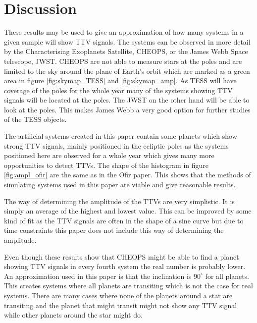 \documentclass[12pt]{report}
\begin{document}

\chapter{Discussion}
	These results may be used to give an approximation of how many systems in a given sample will show TTV signals. The systems can be observed in more detail by the Characterising Exoplanets Satellite, CHEOPS, or the James Webb Space telescope, JWST. CHEOPS are not able to measure stars at the poles and are limited to the sky around the plane of Earth's orbit which are marked as a green area in figure \ref{fig:skymap_TESS} and \ref{fig:skymap_amp}. As TESS will have coverage of the poles for the whole year many of the systems showing TTV signals will be located at the poles. The JWST on the other hand will be able to look at the poles. This makes James Webb a very good option for further studies of the TESS objects. 
	
	The artificial systems created in this paper contain some planets which show strong TTV signals, mainly positioned in the ecliptic poles as the systems positioned here are observed for a whole year which gives many more opportunities to detect TTVs. The shape of the histogram in figure \ref{fig:ampl_ofir} are the same as in the Ofir paper. This shows that the methods of simulating systems used in this paper are viable and give reasonable results.
	
	The way of determining the amplitude of the TTVs are very simplistic. It is simply an average of the highest and lowest value. This can be improved by some kind of fit as the TTV signals are often in the shape of a sine curve but due to time constraints this paper does not include this way of determining the amplitude.
	
	Even though these results show that CHEOPS might be able to find a planet showing TTV signals in every fourth system the real number is probably lower. An approximation used in this paper is that the inclination is $90^{\circ}$ for all planets. This creates systems where all planets are transiting which is not the case for real systems. There are many cases where none of the planets around a star are transiting and the planet that might transit might not show any TTV signal while other planets around the star might do.
	
\end{document}
